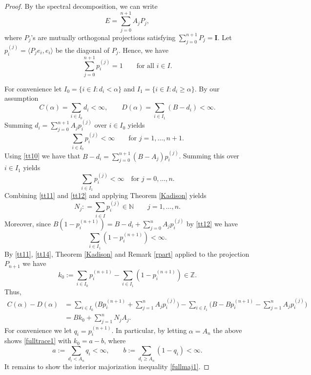 \documentclass[12pt]{amsart}
\newcounter{Theorem}
\numberwithin{equation}{section}
\numberwithin{Theorem}{section}
\theoremstyle{plain}
\theoremstyle{definition}
\theoremstyle{remark}
\begin{document}
\begin{proof}
By the spectral decomposition, we can write
\[
E= \sum_{j=0}^{n+1} A_{j} P_j,
\]
where $P_j$'s are mutually orthogonal projections satisfying $\sum_{j=0}^{n+1}P_j={\mathbf I}$. Let $p^{(j)}_{i}=\langle P_je_{i},e_{i}\rangle$ be the diagonal of $P_j$. Hence, we have
\begin{equation}\label{tt10}
\sum_{j=0}^{n+1} p_i^{(j)}=1
\qquad\text{for all } i\in I.
\end{equation} 

For convenience let $I_0=\{i\in I: d_{i}<\alpha\}$ and $I_1=\{i\in I: d_{i} \ge \alpha\}$. By our assumption
\[
C(\alpha) = \sum_{i\in I_0} d_i <\infty, \qquad  D(\alpha) = \sum_{i\in I_1} (B- d_i)<\infty.
\]
Summing $d_i = \sum_{j=0}^{n+1} A_j p_i^{(j)}$ over $i\in I_0$ yields
\begin{equation}\label{tt11}
\sum_{i\in I_0} p_i^{(j)} < \infty \qquad\text{for }j=1,\ldots,n+1.
\end{equation}
Using \eqref{tt10} we have that $B-d_i = \sum_{j=0}^{n+1} (B-A_j) p_i^{(j)}$. Summing this over $i\in I_1$ yields
\begin{equation}\label{tt12}
\sum_{i\in I_1} p_i^{(j)} < \infty \quad\text{for }j=0,\ldots,n.
\end{equation}
Combining \eqref{tt11} and \eqref{tt12} and applying Theorem \ref{Kadison} yields
\begin{equation}\label{tt13}
N_j : = \sum_{i \in I} p_i^{(j)} \in{\mathbb{N}} \qquad j=1,\ldots,n.
\end{equation}
Moreover, since $ B(1-p_i^{(n+1)}) = B-d_i+ \sum_{j=0}^n A_j p_i^{(j)}$ by \eqref{tt12} we have
\begin{equation}\label{tt14}
\sum_{i\in I_1} (1-p_i^{(n+1)}) < \infty.
\end{equation}
By \eqref{tt11}, \eqref{tt14}, Theorem \ref{Kadison} and Remark \ref{rpart} applied to the projection $P_{n+1}$ we have
\[
k_0:=\sum_{i\in I_0} p_i^{(n+1)}-\sum_{i\in I_1} (1-p_i^{(n+1)}) \in {\mathbb{Z}}.
\]
Thus,
\[
\begin{aligned}
C(\alpha) - D(\alpha) &= \sum_{i\in I_0}  \bigg(Bp_i^{(n+1)} +  \sum_{j=1}^{n} A_j p_i^{(j)}  \bigg) - \sum_{i\in I_1} \bigg( B- Bp_i^{(n+1)}  - \sum_{j=1}^{n} A_j p_i^{(j)} \bigg) 
\\
&= Bk_0 + \sum_{j=1}^n N_j A_j.
\end{aligned}
\]
For convenience we let $q_i=p_i^{(n+1)}$. In particular, by letting $\alpha=A_n$ the above shows \eqref{fulltrace1} with $k_0=a-b$, where
\[
a:=\sum_{d_i<A_n}q_{i}<\infty,\qquad b:=\sum_{d_i \ge A_n}(1-q_{i})<\infty.
\]
It remains to show the interior majorization inequality \eqref{fullmaj1}.


\end{proof}
\end{document}
